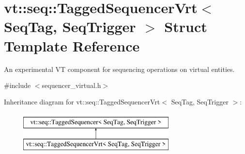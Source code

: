 \hypertarget{structvt_1_1seq_1_1_tagged_sequencer_vrt}{}\section{vt\+:\+:seq\+:\+:Tagged\+Sequencer\+Vrt$<$ Seq\+Tag, Seq\+Trigger $>$ Struct Template Reference}
\label{structvt_1_1seq_1_1_tagged_sequencer_vrt}


An experimental VT component for sequencing operations on virtual entities.  




{\ttfamily \#include $<$sequencer\+\_\+virtual.\+h$>$}

Inheritance diagram for vt\+:\+:seq\+:\+:Tagged\+Sequencer\+Vrt$<$ Seq\+Tag, Seq\+Trigger $>$\+:\begin{figure}[H]
\begin{center}
\leavevmode
\includegraphics[height=2.000000cm]{structvt_1_1seq_1_1_tagged_sequencer_vrt}
\end{center}
\end{figure}
